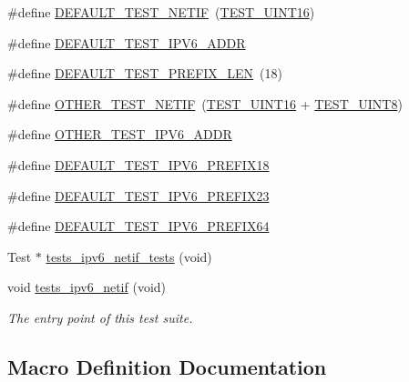 \begin{DoxyCompactItemize}
\item 
\#define \hyperlink{tests-ipv6__netif_8c_a4363511a72358df34aa4f691e9862615}{D\+E\+F\+A\+U\+L\+T\+\_\+\+T\+E\+S\+T\+\_\+\+N\+E\+T\+IF}~(\hyperlink{unittests-constants_8h_ada84310dd4f52d94096d5baed5eb75e1}{T\+E\+S\+T\+\_\+\+U\+I\+N\+T16})
\item 
\#define \hyperlink{tests-ipv6__netif_8c_a6755bbe51b0b21c7587c52253b67907e}{D\+E\+F\+A\+U\+L\+T\+\_\+\+T\+E\+S\+T\+\_\+\+I\+P\+V6\+\_\+\+A\+D\+DR}
\item 
\#define \hyperlink{tests-ipv6__netif_8c_a277f9b189575eb484042d73562e0fb81}{D\+E\+F\+A\+U\+L\+T\+\_\+\+T\+E\+S\+T\+\_\+\+P\+R\+E\+F\+I\+X\+\_\+\+L\+EN}~(18)
\item 
\#define \hyperlink{tests-ipv6__netif_8c_a28844d5b26d53ea819be44b1ad562be1}{O\+T\+H\+E\+R\+\_\+\+T\+E\+S\+T\+\_\+\+N\+E\+T\+IF}~(\hyperlink{unittests-constants_8h_ada84310dd4f52d94096d5baed5eb75e1}{T\+E\+S\+T\+\_\+\+U\+I\+N\+T16} + \hyperlink{unittests-constants_8h_a9a493e3e4fe69d0b8c338869ebcadbc4}{T\+E\+S\+T\+\_\+\+U\+I\+N\+T8})
\item 
\#define \hyperlink{tests-ipv6__netif_8c_a58de43c3cc07985002ae940888107785}{O\+T\+H\+E\+R\+\_\+\+T\+E\+S\+T\+\_\+\+I\+P\+V6\+\_\+\+A\+D\+DR}
\item 
\#define \hyperlink{tests-ipv6__netif_8c_a0eb411cc3411a784d327dbbf2f0c4d61}{D\+E\+F\+A\+U\+L\+T\+\_\+\+T\+E\+S\+T\+\_\+\+I\+P\+V6\+\_\+\+P\+R\+E\+F\+I\+X18}
\item 
\#define \hyperlink{tests-ipv6__netif_8c_a9cc78a3deab4e48b59d5f877785f61f9}{D\+E\+F\+A\+U\+L\+T\+\_\+\+T\+E\+S\+T\+\_\+\+I\+P\+V6\+\_\+\+P\+R\+E\+F\+I\+X23}
\item 
\#define \hyperlink{tests-ipv6__netif_8c_a9550f083d4de0daff945a17316da66d8}{D\+E\+F\+A\+U\+L\+T\+\_\+\+T\+E\+S\+T\+\_\+\+I\+P\+V6\+\_\+\+P\+R\+E\+F\+I\+X64}
\item 
Test $\ast$ \hyperlink{tests-ipv6__netif_8c_a8e371cf04b9c4b0aa11e072256b46fe5}{tests\+\_\+ipv6\+\_\+netif\+\_\+tests} (void)
\item 
void \hyperlink{group__unittests_gaee22d83f1a9d3716168640ccd429c918}{tests\+\_\+ipv6\+\_\+netif} (void)
\begin{DoxyCompactList}\small\item\em The entry point of this test suite. \end{DoxyCompactList}\end{DoxyCompactItemize}


\subsection{Macro Definition Documentation}
\mbox{\label{tests-ipv6__netif_8c_a6755bbe51b0b21c7587c52253b67907e}} 
